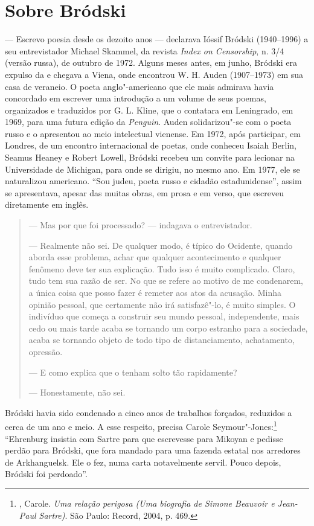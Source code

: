\chapter{Sobre Bródski}
\label{brodski}

--- Escrevo poesia desde os dezoito anos --- declarava Ióssif Bródski
(1940--1996) a seu entrevistador Michael Skammel, da revista \emph{Index
on Censorship}, n. 3/4 (versão russa), de outubro de 1972. Alguns meses
antes, em junho, Bródski era expulso da  e chegava a Viena, onde
encontrou W. H. Auden (1907--1973) em sua casa de veraneio. O poeta
anglo"-americano que ele mais admirava havia concordado em escrever
uma introdução a um volume de seus poemas, organizados e traduzidos por
G. L. Kline, que o contatara em Leningrado, em 1969, para uma
futura edição da \emph{Penguin}. Auden solidarizou"-se com o poeta russo e o apresentou ao
meio intelectual vienense. Em 1972, após participar, em Londres, de um
encontro internacional de poetas, onde conheceu Isaiah Berlin, Seamus
Heaney e Robert Lowell, Bródski recebeu um convite para lecionar na
Universidade de Michigan, para onde se dirigiu, no mesmo ano. Em
1977, ele se naturalizou americano. ``Sou judeu, poeta russo e cidadão
estadunidense'', assim se apresentava, apesar das muitas obras, em
prosa e em verso, que escreveu diretamente em inglês.

\begin{quotation}
--- Mas por que foi processado? --- indagava o entrevistador.

--- Realmente não sei. De qualquer modo, é típico do Ocidente, quando
aborda esse problema, achar que qualquer acontecimento e qualquer
fenômeno deve ter sua explicação. Tudo isso é muito complicado. Claro,
tudo tem sua razão de ser. No que se refere ao motivo de me condenarem, a
única coisa que posso fazer é remeter aos atos da acusação. Minha
opinião pessoal, que certamente não irá satisfazê"-lo, é muito simples. O
indivíduo que começa a construir seu mundo pessoal, independente, mais
cedo ou mais tarde acaba se tornando um corpo estranho para a sociedade,
acaba se tornando objeto de todo tipo de distanciamento, achatamento,
opressão.

--- E como explica que o tenham solto tão rapidamente?

--- Honestamente, não sei.
\end{quotation}

Bródski havia sido condenado a cinco anos de trabalhos forçados,
reduzidos a cerca de um ano e meio. A esse respeito, precisa Carole
Seymour"-Jones:\footnote{, Carole. \emph{Uma
 relação perigosa (Uma biografia de Simone Beauvoir e Jean-Paul Sartre)}. São Paulo: Record, 2004, p. 469.} ``Ehrenburg
insistia com Sartre para que escrevesse para Mikoyan e pedisse perdão
para Bródski, que fora mandado para uma fazenda estatal nos arredores de
Arkhanguelsk. Ele o fez, numa carta notavelmente servil. Pouco depois,
Bródski foi perdoado''.

